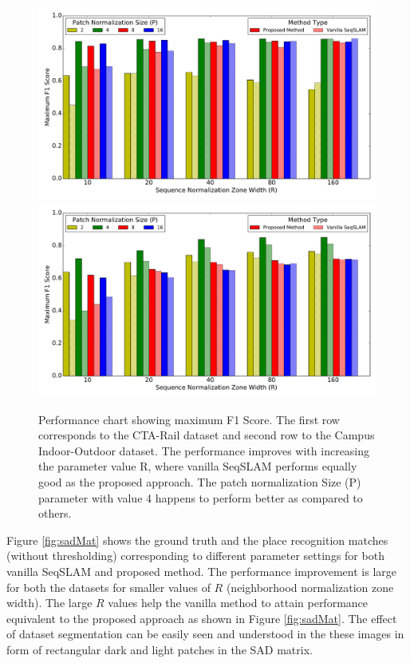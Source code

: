 \documentclass[letterpaper, 10 pt, conference]{ieeeconf}  %
\begin{document}
\begin{figure}
\centering
\includegraphics[scale=0.48]{cta-bar-graph}\\
\includegraphics[scale=0.48]{campus-io-bar-graph}
 \caption{Performance chart showing maximum F1 Score. The first row corresponds to the CTA-Rail dataset and second row to the Campus Indoor-Outdoor dataset. The performance improves with increasing the parameter value R, where vanilla SeqSLAM performs equally good as the proposed approach. The patch normalization Size (P) parameter with value 4 happens to perform better as compared to others.}
 \label{fig:performanceChart}
\end{figure}

Figure \ref{fig:sadMat} shows the ground truth and the place recognition matches (without thresholding) corresponding to different parameter settings for both vanilla SeqSLAM and proposed method. The performance improvement is large for both the datasets for smaller values of $R$ (neighborhood normalization zone width). The large $R$ values help the vanilla method to attain performance equivalent to the proposed approach as shown in Figure \ref{fig:sadMat}. The effect of dataset segmentation can be easily seen and understood in the these images in form of rectangular dark and light patches in the SAD matrix. 
\end{document}
